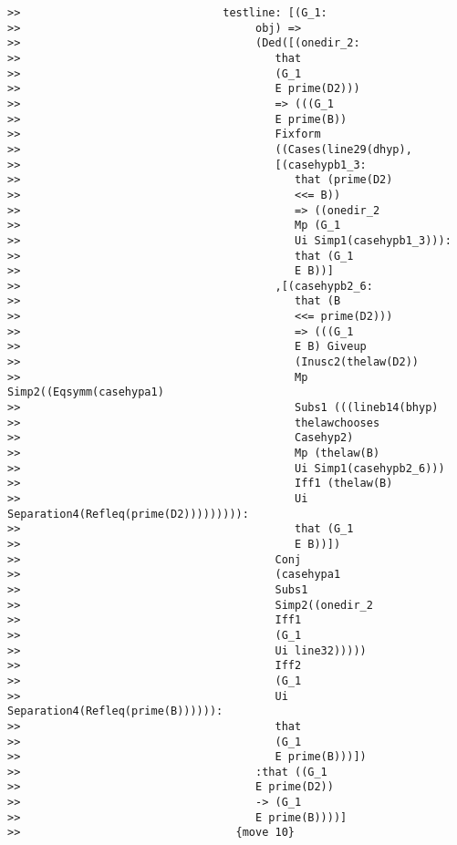 \documentclass[12pt]{article}
\begin{document}
\begin{verbatim}
>>                               testline: [(G_1:
>>                                    obj) =>
>>                                    (Ded([(onedir_2:
>>                                       that
>>                                       (G_1
>>                                       E prime(D2)))
>>                                       => (((G_1
>>                                       E prime(B))
>>                                       Fixform
>>                                       ((Cases(line29(dhyp),
>>                                       [(casehypb1_3:
>>                                          that (prime(D2)
>>                                          <<= B))
>>                                          => ((onedir_2
>>                                          Mp (G_1
>>                                          Ui Simp1(casehypb1_3))):
>>                                          that (G_1
>>                                          E B))]
>>                                       ,[(casehypb2_6:
>>                                          that (B
>>                                          <<= prime(D2)))
>>                                          => (((G_1
>>                                          E B) Giveup
>>                                          (Inusc2(thelaw(D2))
>>                                          Mp Simp2((Eqsymm(casehypa1)
>>                                          Subs1 (((lineb14(bhyp)
>>                                          thelawchooses
>>                                          Casehyp2)
>>                                          Mp (thelaw(B)
>>                                          Ui Simp1(casehypb2_6)))
>>                                          Iff1 (thelaw(B)
>>                                          Ui Separation4(Refleq(prime(D2))))))))):
>>                                          that (G_1
>>                                          E B))])
>>                                       Conj
>>                                       (casehypa1
>>                                       Subs1
>>                                       Simp2((onedir_2
>>                                       Iff1
>>                                       (G_1
>>                                       Ui line32)))))
>>                                       Iff2
>>                                       (G_1
>>                                       Ui Separation4(Refleq(prime(B)))))):
>>                                       that
>>                                       (G_1
>>                                       E prime(B)))])
>>                                    :that ((G_1
>>                                    E prime(D2))
>>                                    -> (G_1
>>                                    E prime(B))))]
>>                                 {move 10}




\end{verbatim}
\end{document}

